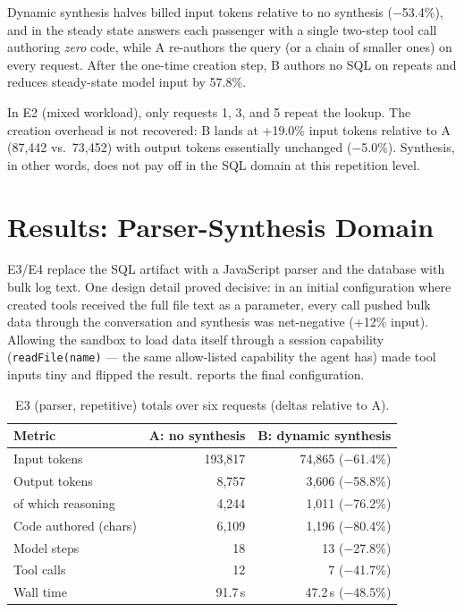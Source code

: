 Dynamic synthesis halves billed input tokens relative to no synthesis
($-$53.4\%), and in the steady state answers each passenger with a single two-step
tool call authoring \emph{zero} code, while A re-authors the query (or a chain of
smaller ones) on every request. After the one-time creation step, B authors no SQL on
repeats and reduces steady-state model input by 57.8\%.

In E2 (mixed workload), only requests 1, 3, and 5 repeat the lookup. The creation
overhead is not recovered: B lands at +19.0\% input tokens relative to A
(87{,}442 vs.\ 73{,}452) with output tokens essentially unchanged ($-$5.0\%).
Synthesis, in other words, does not pay off in the SQL domain at this repetition
level.

\section{Results: Parser-Synthesis Domain}
E3/E4 replace the SQL artifact with a JavaScript parser and the database with bulk
log text. One design detail proved decisive: in an initial configuration where
created tools received the full file text as a parameter, every call pushed bulk data
through the conversation and synthesis was net-negative (+12\% input). Allowing the
sandbox to load data itself through a session capability (\texttt{readFile(name)} ---
the same allow-listed capability the agent has) made tool inputs tiny and flipped the
result.  reports the final configuration.

\begin{table}[htbp]
    \centering
    \caption{E3 (parser, repetitive) totals over six requests (deltas relative to A).}
    \label{tab:e3_totals}
    \small
    \begin{tabular}{@{}lrr@{}}
        \toprule
        \textbf{Metric} & \textbf{A: no synthesis} & \textbf{B: dynamic synthesis} \\
        \midrule
        Input tokens        & 193{,}817 & 74{,}865 ($-$61.4\%) \\
        Output tokens       & 8{,}757   & 3{,}606 ($-$58.8\%) \\
        \quad of which reasoning & 4{,}244 & 1{,}011 ($-$76.2\%) \\
        Code authored (chars)& 6{,}109  & 1{,}196 ($-$80.4\%) \\
        Model steps         & 18        & 13 ($-$27.8\%) \\
        Tool calls          & 12        & 7 ($-$41.7\%) \\
        Wall time           & 91.7\,s   & 47.2\,s ($-$48.5\%) \\
        \bottomrule
    \end{tabular}
\end{table}

